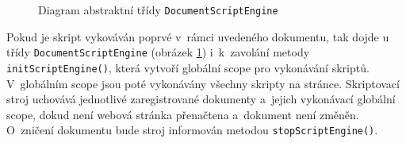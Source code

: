 \begin{figure}[H]
  \begin{center}
    \caption{Diagram abstraktní třídy \texttt{DocumentScriptEngine}}
    \label{Figure.DocumentScriptEngineDesign}
  \end{center}
\end{figure}

Pokud je skript vykováván poprvé v~rámci uvedeného dokumentu, tak dojde u třídy \texttt{DocumentScriptEngine} (obrázek \ref{Figure.DocumentScriptEngineDesign}) i~k~zavolání metody \texttt{initScriptEngine()}, která vytvoří globální scope pro vykonávání skriptů. V~globálním scope  jsou poté vykonávány všechny skripty na stránce. Skriptovací stroj uchovává jednotlivé zaregistrované dokumenty a~jejich vykonávací globální scope, dokud není webová stránka přenačtena a~dokument není změněn. O~zničení dokumentu bude stroj informován metodou \texttt{stopScriptEngine()}.

